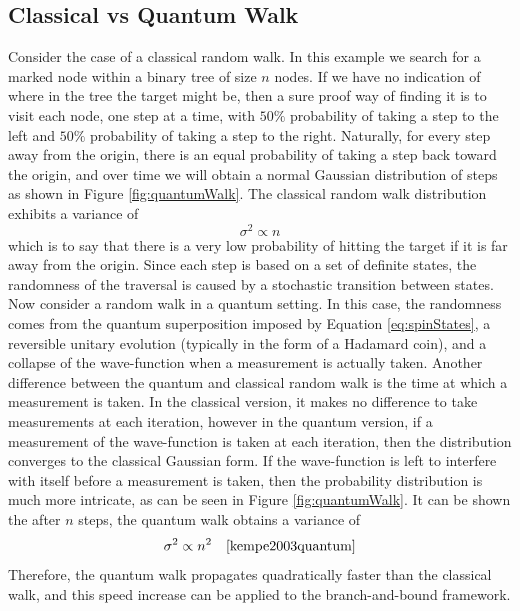 	\subsection{Classical vs Quantum Walk}
	
		Consider the case of a classical random walk. In this example we search for a marked node within a binary tree of size $n$ nodes. 
		If we have no indication of where in the tree the target might be, then a sure proof way of finding it is to visit each node, one step at a time, with $50\%$ probability of taking a step to the left and $50\%$ probability of taking a step to the right. 
		Naturally, for every step away from the origin, there is an equal probability of taking a step back toward the origin, and over time we will obtain a normal Gaussian distribution of steps as shown in Figure \ref{fig:quantumWalk}. 
		The classical random walk distribution exhibits a variance of 
		\begin{equation}
			\sigma^2 \propto n
		\end{equation}
		which is to say that there is a very low probability of hitting the target if it is far away from the origin.
		Since  each step is based on a set of definite states, the randomness of the traversal is caused by a stochastic transition between states.
		Now consider a random walk in a quantum setting. 
		In this case, the randomness comes from the quantum superposition imposed by Equation \ref{eq:spinStates}, a reversible unitary evolution (typically in the form of a Hadamard coin), and a collapse of the wave-function when a measurement is actually taken. 
		Another difference between the quantum and classical random walk is the time at which a measurement is taken. 
		In the classical version, it makes no difference to take measurements at each iteration, however in the quantum version, if a measurement of the wave-function is taken at each iteration, then the distribution converges to the classical Gaussian form. 
		If the wave-function is left to interfere with itself before a measurement is taken, then the probability distribution is much more intricate, as can be seen in Figure \ref{fig:quantumWalk}.
		It can be shown the after $n$ steps, the quantum walk obtains a variance of 
		\begin{equation}
			\sigma^2 \propto n^2 \quad\cite{kempe2003quantum}
		\end{equation}
		Therefore, the quantum walk propagates quadratically faster than the classical walk, and this speed increase can be applied to the branch-and-bound framework. 

